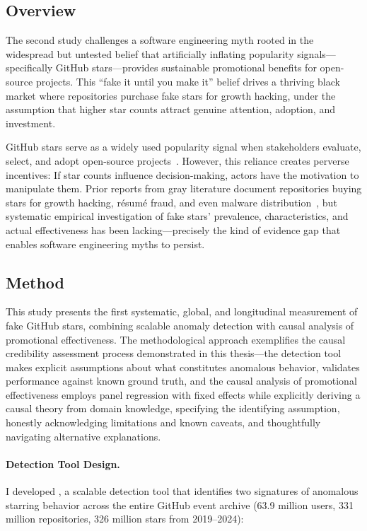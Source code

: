 \subsection{Overview}

The second study challenges a software engineering myth rooted in the widespread but untested belief that artificially inflating popularity signals---specifically GitHub stars---provides sustainable promotional benefits for open-source projects.
This ``fake it until you make it'' belief drives a thriving black market where repositories purchase fake stars for growth hacking, under the assumption that higher star counts attract genuine attention, adoption, and investment.

GitHub stars serve as a widely used popularity signal when stakeholders evaluate, select, and adopt open-source projects~\cite{DBLP:journals/jss/BorgesV18, DBLP:journals/pacmhci/QiuLPSV19, DBLP:conf/sigsoft/VargasATBG20}.
However, this reliance creates perverse incentives: If star counts influence decision-making, actors have the motivation to manipulate them.
Prior reports from gray literature document repositories buying stars for growth hacking, r\'{e}sum\'{e} fraud, and even malware distribution~\cite{stargazer-goblin}, but systematic empirical investigation of fake stars' prevalence, characteristics, and actual effectiveness has been lacking---precisely the kind of evidence gap that enables software engineering myths to persist.

\subsection{Method}

This study presents the first systematic, global, and longitudinal measurement of fake GitHub stars, combining scalable anomaly detection with causal analysis of promotional effectiveness.
The methodological approach exemplifies the causal credibility assessment process demonstrated in this thesis---the detection tool makes explicit assumptions about what constitutes anomalous behavior, validates performance against known ground truth, and the causal analysis of promotional effectiveness employs panel regression with fixed effects while explicitly deriving a causal theory from domain knowledge, specifying the identifying assumption, honestly acknowledging limitations and known caveats, and thoughtfully navigating alternative explanations.

\paragraph{Detection Tool Design.}
I developed \SystemName, a scalable detection tool that identifies two signatures of anomalous starring behavior across the entire GitHub event archive (63.9 million users, 331 million repositories, 326 million stars from 2019--2024):

